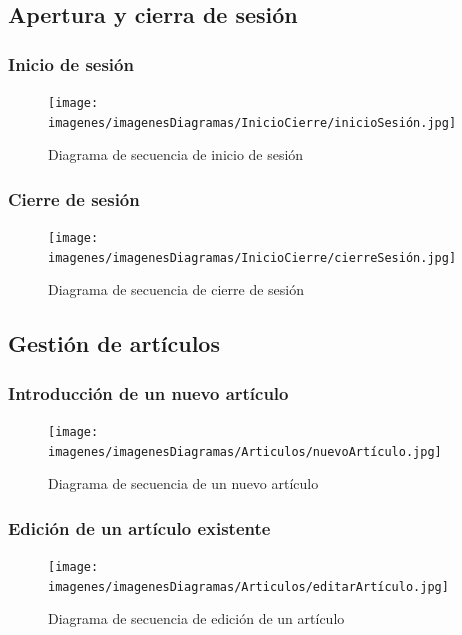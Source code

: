 \subsection{Apertura y cierra de sesión}

\subsubsection{Inicio de sesión}

\begin{figure}[H]
	\centering
	\texttt{[image: imagenes/imagenesDiagramas/InicioCierre/inicioSesión.jpg]}
	\caption{Diagrama de secuencia de inicio de sesión}
	\label{fig:seqdiag1}
\end{figure}

\subsubsection{Cierre de sesión}

\begin{figure}[H]
	\centering
	\texttt{[image: imagenes/imagenesDiagramas/InicioCierre/cierreSesión.jpg]}
	\caption{Diagrama de secuencia de cierre de sesión}
	\label{fig:seqdiag2}
\end{figure}

\subsection{Gestión de artículos}

\subsubsection{Introducción de un nuevo artículo}

\begin{figure}[H]
	\centering
	\texttt{[image: imagenes/imagenesDiagramas/Articulos/nuevoArtículo.jpg]}
	\caption{Diagrama de secuencia de un nuevo artículo}
	\label{fig:seqdiag3}
\end{figure}

\subsubsection{Edición de un artículo existente}

\begin{figure}[H]
	\centering
	\texttt{[image: imagenes/imagenesDiagramas/Articulos/editarArtículo.jpg]}
	\caption{Diagrama de secuencia de edición de un artículo}
	\label{fig:seqdiag4}
\end{figure}

